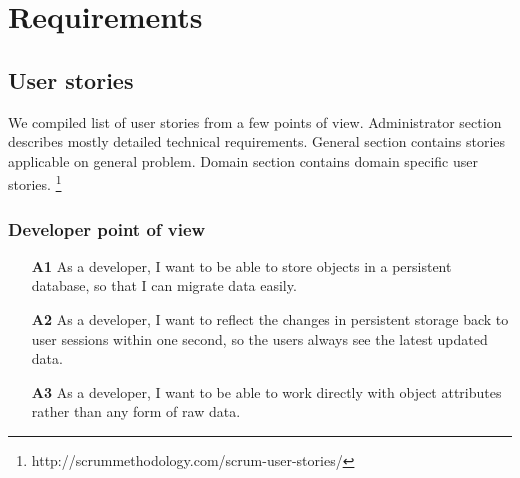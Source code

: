 \chapter{Requirements}
\section{User stories}
We compiled list of user stories from a few points of view. Administrator section describes mostly detailed technical requirements. General section contains stories applicable on general problem. Domain section contains domain specific user stories. \footnote{http://scrummethodology.com/scrum-user-stories/}

\subsection*{Developer point of view}
\begin{itemize}
  \item [\textbf{A1}] As a developer, I want to be able to store objects in a persistent database, so that I can migrate data easily.
  \item [\textbf{A2}] As a developer, I want to reflect the changes in persistent storage back to user sessions within one second, so the users always see the latest updated data.
  \item [\textbf{A3}] As a developer, I want to be able to work directly with object attributes rather than any form of raw data.
\end{itemize}

